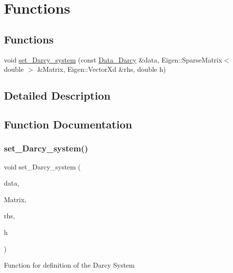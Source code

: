 \hypertarget{group__Functions}{}\section{Functions}
\label{group__Functions}
\subsection*{Functions}
\begin{DoxyCompactItemize}
\item 
void \hyperlink{group__Functions_gafbabf263d46e20e1944c836bbbf5c770}{set\+\_\+\+Darcy\+\_\+system} (const \hyperlink{classData__Darcy}{Data\+\_\+\+Darcy} \&data, Eigen\+::\+Sparse\+Matrix$<$ double $>$ \&Matrix, Eigen\+::\+Vector\+Xd \&rhs, double h)
\end{DoxyCompactItemize}


\subsection{Detailed Description}


\subsection{Function Documentation}
\mbox{\label{group__Functions_gafbabf263d46e20e1944c836bbbf5c770}} 
\subsubsection{\texorpdfstring{set\+\_\+\+Darcy\+\_\+system()}{set\_Darcy\_system()}}
{\footnotesize\ttfamily void set\+\_\+\+Darcy\+\_\+system (\begin{DoxyParamCaption}\item[{const \hyperlink{classData__Darcy}{Data\+\_\+\+Darcy} \&}]{data,  }\item[{Eigen\+::\+Sparse\+Matrix$<$ double $>$ \&}]{Matrix,  }\item[{Eigen\+::\+Vector\+Xd \&}]{rhs,  }\item[{double}]{h }\end{DoxyParamCaption})}

Function for definition of the Darcy System 